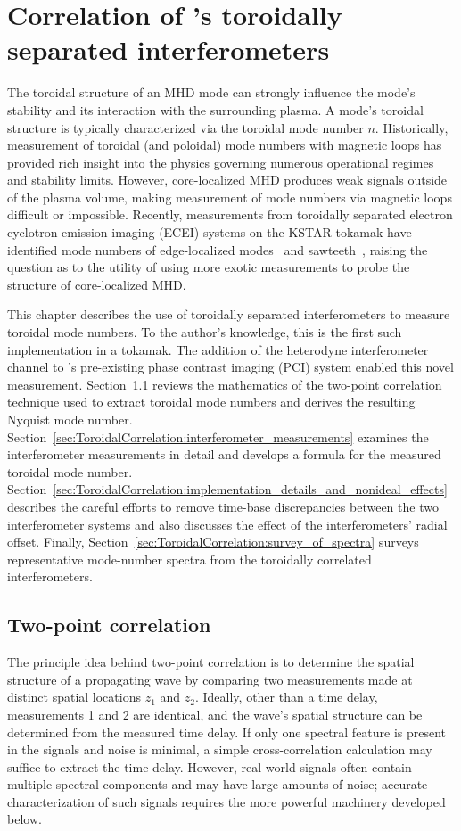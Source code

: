 \chapter{Correlation of \diiid's toroidally separated interferometers}
The toroidal structure of an MHD mode can strongly influence
the mode's stability and its interaction with the surrounding plasma.
A mode's toroidal structure is typically characterized
via the toroidal mode number $n$.
Historically, measurement of toroidal (and poloidal) mode numbers
with magnetic loops has provided rich insight
into the physics governing numerous operational regimes and stability limits.
However, core-localized MHD produces weak signals outside of the plasma volume,
making measurement of mode numbers via magnetic loops difficult or impossible.
Recently, measurements from toroidally separated
electron cyclotron emission imaging (ECEI) systems
on the KSTAR tokamak have identified mode numbers of
edge-localized modes~\cite{lee_rsi_2014} and
sawteeth~\cite{choe_nf_2015},
raising the question as to the utility of using more exotic measurements
to probe the structure of core-localized MHD.

This chapter describes the use of toroidally separated interferometers
to measure toroidal mode numbers.
To the author's knowledge, this is the first such implementation in a tokamak.
The addition of the heterodyne interferometer channel
to \diiid's pre-existing phase contrast imaging (PCI) system
enabled this novel measurement.
Section~\ref{sec:ToroidalCorrelation:two_point_correlation}
reviews the mathematics of the two-point correlation technique
used to extract toroidal mode numbers and
derives the resulting Nyquist mode number.
Section~\ref{sec:ToroidalCorrelation:interferometer_measurements}
examines the interferometer measurements in detail and
develops a formula for the measured toroidal mode number.
Section~\ref{sec:ToroidalCorrelation:implementation_details_and_nonideal_effects}
describes the careful efforts to remove time-base discrepancies
between the two interferometer systems and
also discusses the effect of the interferometers' radial offset.
Finally, Section~\ref{sec:ToroidalCorrelation:survey_of_spectra}
surveys representative mode-number spectra
from the toroidally correlated interferometers.


\section{Two-point correlation}
\label{sec:ToroidalCorrelation:two_point_correlation}
The principle idea behind two-point correlation
is to determine the spatial structure of a propagating wave
by comparing two measurements made
at distinct spatial locations $z_1$ and $z_2$.
Ideally, other than a time delay, measurements 1 and 2 are identical, and
the wave's spatial structure can be determined from the measured time delay.
If only one spectral feature is present in the signals and noise is minimal,
a simple cross-correlation calculation may suffice to extract the time delay.
However, real-world signals often contain multiple spectral components and
may have large amounts of noise;
accurate characterization of such signals requires the more powerful
machinery developed below.

